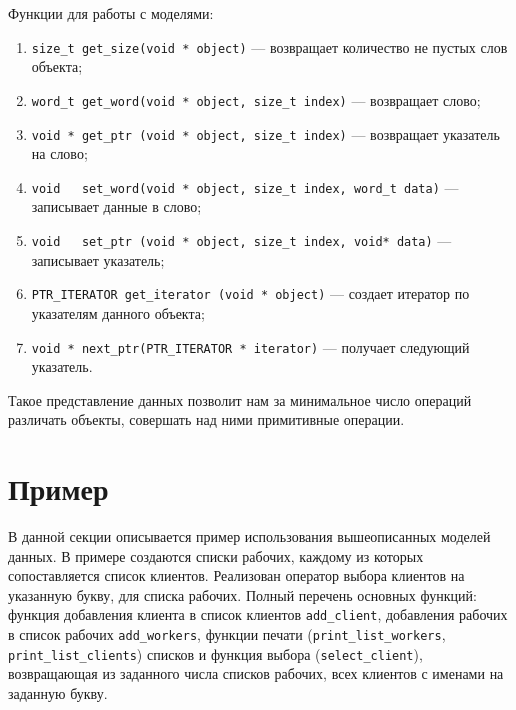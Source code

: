 Функции для работы с моделями:
\begin{enumerate}
\item \lstinline{size_t get_size(void * object)} --- возвращает количество не пустых слов объекта; 
\item \lstinline{word_t get_word(void * object, size_t index)} --- возвращает слово;
\item \lstinline{void * get_ptr (void * object, size_t index)} --- возвращает указатель на слово;
\item \lstinline{void   set_word(void * object, size_t index, word_t data)} --- записывает данные в слово;
\item \lstinline{void   set_ptr (void * object, size_t index, void* data)} --- записывает указатель;
\item \lstinline{PTR_ITERATOR get_iterator (void * object)} --- создает итератор по указателям данного объекта;
\item \lstinline{void * next_ptr(PTR_ITERATOR * iterator)} --- получает следующий указатель.
\end{enumerate}
Такое представление данных позволит нам за минимальное число операций различать объекты, совершать над ними примитивные операции.


\section{Пример}
В данной секции описывается пример использования вышеописанных моделей данных.
В примере создаются списки рабочих, каждому из которых сопоставляется список клиентов. Реализован оператор выбора клиентов на указанную букву,  для списка рабочих.
Полный перечень основных функций: функция добавления клиента в список клиентов \lstinline{add_client}, добавления рабочих в список рабочих \lstinline{add_workers}, 
функции печати (\lstinline{print_list_workers}, \lstinline{print_list_clients}) списков и функция выбора (\lstinline{select_client}),
возвращающая из заданного числа списков рабочих,  всех клиентов с именами на заданную букву.  

